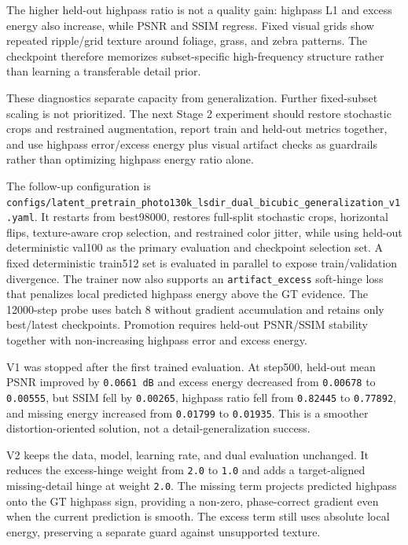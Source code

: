 \documentclass[
  10pt,
]{article}
\begin{document}
The higher held-out highpass ratio is not a quality gain: highpass L1
and excess energy also increase, while PSNR and SSIM regress. Fixed
visual grids show repeated ripple/grid texture around foliage, grass,
and zebra patterns. The checkpoint therefore memorizes subset-specific
high-frequency structure rather than learning a transferable detail
prior.

These diagnostics separate capacity from generalization. Further
fixed-subset scaling is not prioritized. The next Stage 2 experiment
should restore stochastic crops and restrained augmentation, report
train and held-out metrics together, and use highpass error/excess
energy plus visual artifact checks as guardrails rather than optimizing
highpass energy ratio alone.

The follow-up configuration is
\texttt{configs/latent\_pretrain\_photo130k\_lsdir\_dual\_bicubic\_generalization\_v1.yaml}.
It restarts from best98000, restores full-split stochastic crops,
horizontal flips, texture-aware crop selection, and restrained color
jitter, while using held-out deterministic val100 as the primary
evaluation and checkpoint selection set. A fixed deterministic train512
set is evaluated in parallel to expose train/validation divergence. The
trainer now also supports an \texttt{artifact\_excess} soft-hinge loss
that penalizes local predicted highpass energy above the GT evidence.
The 12000-step probe uses batch 8 without gradient accumulation and
retains only best/latest checkpoints. Promotion requires held-out
PSNR/SSIM stability together with non-increasing highpass error and
excess energy.

V1 was stopped after the first trained evaluation. At step500, held-out
mean PSNR improved by \texttt{0.0661\ dB} and excess energy decreased
from \texttt{0.00678} to \texttt{0.00555}, but SSIM fell by
\texttt{0.00265}, highpass ratio fell from \texttt{0.82445} to
\texttt{0.77892}, and missing energy increased from \texttt{0.01799} to
\texttt{0.01935}. This is a smoother distortion-oriented solution, not a
detail-generalization success.

V2 keeps the data, model, learning rate, and dual evaluation unchanged.
It reduces the excess-hinge weight from \texttt{2.0} to \texttt{1.0} and
adds a target-aligned missing-detail hinge at weight \texttt{2.0}. The
missing term projects predicted highpass onto the GT highpass sign,
providing a non-zero, phase-correct gradient even when the current
prediction is smooth. The excess term still uses absolute local energy,
preserving a separate guard against unsupported texture.
\end{document}
